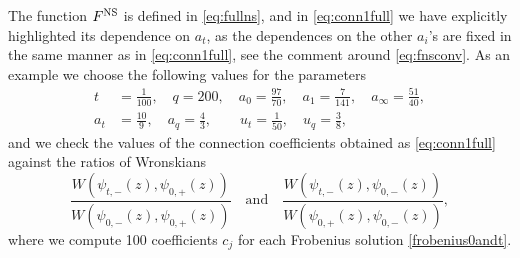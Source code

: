 \documentclass[11pt]{article}
\numberwithin{equation}{section}
\begin{document}
The function $F^{\rm NS}$  is defined in \eqref{eq:fullns}, and in \eqref{eq:conn1full} we have explicitly highlighted its dependence on $a_t$, as the dependences on the other $a_i$’s are fixed in the same manner as in \eqref{eq:conn1full}, see the comment around \eqref{eq:fnsconv}.
%
As an example we choose the following values for the parameters
\begin{equation}\label{eq:numtest}
\begin{aligned}
t&=\frac{1}{100},\quad
q=200,\quad
a_0=\frac{97}{70},\quad
a_1=\frac{7}{141},\quad
a_{\infty}=\frac{51}{40},\\
a_t&=\frac{10}{9},\quad
a_{q}=\frac{4}{3},\quad\quad
u_t=\frac{1}{50},\quad
u_{q}=\frac{3}{8},
\end{aligned}
\end{equation}
and we check the values of the connection coefficients obtained as \eqref{eq:conn1full}  against the ratios of Wronskians
\begin{equation}
\frac{W\left(\psi_{t,-}(z),\psi_{0,+}(z)\right)}{W\left(\psi_{0,-}(z),\psi_{0,+}(z)\right)}\quad\text{and}\quad\frac{W\left(\psi_{t,-}(z),\psi_{0,-}(z)\right)}{W\left(\psi_{0,+}(z),\psi_{0,-}(z)\right)},
\end{equation}
where we compute 100 coefficients $c_j$ for each Frobenius solution \eqref{frobenius0andt}.
\end{document}
